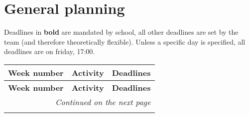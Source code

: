 \documentclass{article} %
\begin{document}
    \section{General planning} %
    Deadlines in \textbf{bold} are mandated by school, all other deadlines are set by the team (and therefore theoretically flexible).
    Unless a specific day is specified, all deadlines are on friday, 17:00.
    \begin{longtable}{|l|p{}|p{}|}
    \hline
    \textbf{Week number} & \textbf{Activity} & \textbf{Deadlines} \\ \hline
    \endfirsthead

    \hline
    \textbf{Week number} & \textbf{Activity} & \textbf{Deadlines} \\ \hline
    \endhead

    \hline \multicolumn{3}{r}{\textit{Continued on the next page}} \\ \hline
    \endfoot

    \hline
    \endlastfoot


\end{longtable}
\end{document}
